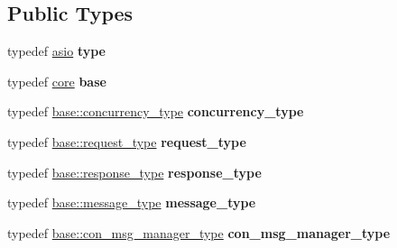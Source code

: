 \subsection*{Public Types}
\begin{DoxyCompactItemize}
\item 
\mbox{\label{structwebsocketpp_1_1config_1_1asio_a14c6f9da27b459266c165df5f40e4ba1}} 
typedef \mbox{\hyperlink{structwebsocketpp_1_1config_1_1asio}{asio}} {\bfseries type}
\item 
\mbox{\label{structwebsocketpp_1_1config_1_1asio_a7f88d72d2fdfa55bd0c96e45709f8199}} 
typedef \mbox{\hyperlink{structwebsocketpp_1_1config_1_1core}{core}} {\bfseries base}
\item 
\mbox{\label{structwebsocketpp_1_1config_1_1asio_a4f2036249aa6a4a627ac42cc38cdaa06}} 
typedef \mbox{\hyperlink{classwebsocketpp_1_1concurrency_1_1basic}{base\+::concurrency\+\_\+type}} {\bfseries concurrency\+\_\+type}
\item 
\mbox{\label{structwebsocketpp_1_1config_1_1asio_ab378f1fa9cdbf4736b0202666c9abe53}} 
typedef \mbox{\hyperlink{classwebsocketpp_1_1http_1_1parser_1_1request}{base\+::request\+\_\+type}} {\bfseries request\+\_\+type}
\item 
\mbox{\label{structwebsocketpp_1_1config_1_1asio_a2336ebfd28c36b1e66257ae57ad5296c}} 
typedef \mbox{\hyperlink{classwebsocketpp_1_1http_1_1parser_1_1response}{base\+::response\+\_\+type}} {\bfseries response\+\_\+type}
\item 
\mbox{\label{structwebsocketpp_1_1config_1_1asio_a89136a9c3a37041226d8d2aaea90fdb1}} 
typedef \mbox{\hyperlink{classwebsocketpp_1_1message__buffer_1_1message}{base\+::message\+\_\+type}} {\bfseries message\+\_\+type}
\item 
\mbox{\label{structwebsocketpp_1_1config_1_1asio_a3473cd31498718e4cc11d5b34f71d4e6}} 
typedef \mbox{\hyperlink{classwebsocketpp_1_1message__buffer_1_1alloc_1_1con__msg__manager}{base\+::con\+\_\+msg\+\_\+manager\+\_\+type}} {\bfseries con\+\_\+msg\+\_\+manager\+\_\+type}

\end{DoxyCompactItemize}

